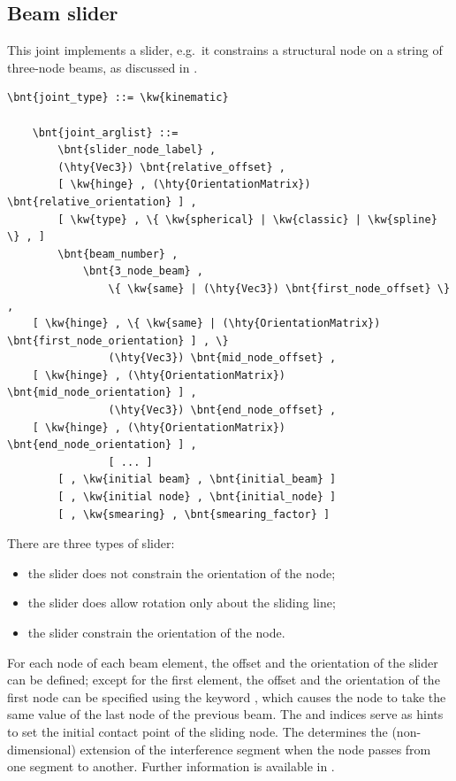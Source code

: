 \subsection{Beam slider}
This joint implements a slider, e.g.\ it constrains a structural node 
on a string of three-node beams, as discussed in \cite{SLIDER-AIDAA-2003}.
\begin{Verbatim}[commandchars=\\\{\}]
    \bnt{joint_type} ::= \kw{kinematic}

    \bnt{joint_arglist} ::=
        \bnt{slider_node_label} ,
        (\hty{Vec3}) \bnt{relative_offset} ,
        [ \kw{hinge} , (\hty{OrientationMatrix}) \bnt{relative_orientation} ] ,
        [ \kw{type} , \{ \kw{spherical} | \kw{classic} | \kw{spline} \} , ]
        \bnt{beam_number} ,
            \bnt{3_node_beam} ,
                \{ \kw{same} | (\hty{Vec3}) \bnt{first_node_offset} \} ,
    [ \kw{hinge} , \{ \kw{same} | (\hty{OrientationMatrix}) \bnt{first_node_orientation} ] , \}
                (\hty{Vec3}) \bnt{mid_node_offset} ,
    [ \kw{hinge} , (\hty{OrientationMatrix}) \bnt{mid_node_orientation} ] ,
                (\hty{Vec3}) \bnt{end_node_offset} ,
    [ \kw{hinge} , (\hty{OrientationMatrix}) \bnt{end_node_orientation} ] ,
                [ ... ]
        [ , \kw{initial beam} , \bnt{initial_beam} ]
        [ , \kw{initial node} , \bnt{initial_node} ]
        [ , \kw{smearing} , \bnt{smearing_factor} ]
\end{Verbatim}
There are three types of slider:
\begin{itemize}
	\item the  slider does not constrain
	the orientation of the node;
	\item the  slider does allow rotation
	only about the sliding line;
	\item the  slider constrain the orientation
	of the node.
\end{itemize}
For each node of each beam element, the offset and the orientation
of the slider can be defined; except for the first element, the
offset and the orientation of the first node can be specified using
the keyword , which causes the node to take the same
value of the last node of the previous beam.
The  and  indices
serve as hints to set the initial contact point of the sliding node.
The  determines the (non-dimensional) extension
of the interference segment when the node passes from one segment
to another.
Further information is available in \cite{SLIDER-AIDAA-2003}.



